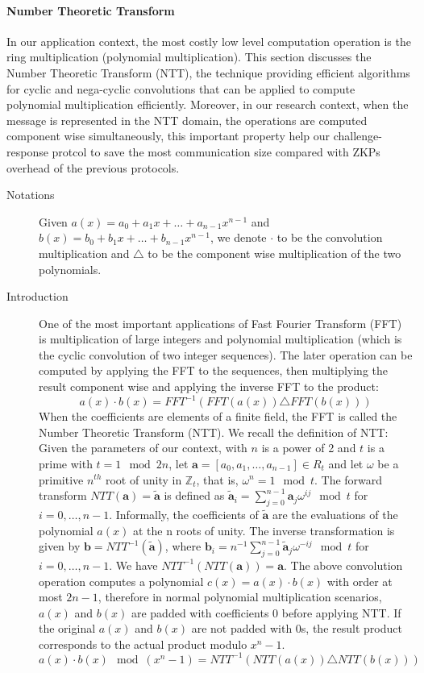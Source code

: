 \paragraph{Number Theoretic Transform}
In our application context, the most costly low level computation operation is
the ring multiplication (polynomial multiplication). This section discusses the
Number Theoretic Transform (NTT), the technique providing efficient algorithms
for cyclic and nega-cyclic convolutions that can be applied to compute
polynomial multiplication efficiently. Moreover, in our research context, when
the message is represented in the NTT domain, the operations are computed
component wise simultaneously, this important property help our
challenge-response protcol to save the most communication size compared with
ZKPs overhead of the previous protocols.
\begin{description}
\item[Notations] Given \(a(x) = a_{0} + a_{1}x + \dots + a_{n-1}x^{n-1}\) and
  \(b(x) = b_{0} + b_{1}x + \dots + b_{n-1}x^{n-1}\), we denote \(\cdot\) to be
  the convolution multiplication and \(\triangle\) to be the component wise
  multiplication of the two polynomials.
\item[Introduction] One of the most important applications of Fast Fourier
  Transform (FFT) is multiplication of large integers and polynomial
  multiplication (which is the cyclic convolution of two integer sequences). The
  later operation can be computed by applying the FFT to the sequences, then
  multiplying the result component wise and applying the inverse FFT to the
  product:
  \[
    a(x)\cdot b(x) = FFT^{-1}(FFT(a(x)) \triangle FFT(b(x)))
  \]
  When the coefficients are elements of a finite field, the FFT is called the
  Number Theoretic Transform (NTT). We recall the definition of NTT: Given the
  parameters of our context, with \(n\) is a power of 2 and \(t\) is a prime
  with \(t = 1 \mod 2n\), let
  \(\mathbf{a} = [a_{0}, a_{1}, \dots, a_{n-1}] \in R_{t}\) and let \(\omega\)
  be a primitive \(n^{th}\) root of unity in \(\mathbb{Z}_{t}\), that is,
  \(\omega^{n} = 1 \mod t\). The forward transform
  \(NTT(\mathbf{a}) = \tilde{\mathbf{a}}\) is defined as
  \(\tilde{\mathbf{a}}_{i} = \sum_{j=0}^{n-1}{\mathbf{a}_{j}}\omega^{ij} \mod
  t\) for \(i = 0, \dots, n -1\). Informally, the coefficients of
  \(\tilde{\mathbf{a}}\) are the evaluations of the polynomial \(a(x)\) at the n
  roots of unity. The inverse transformation is given by
  \(\mathbf{b} = NTT^{-1}(\tilde{\mathbf{a}})\), where
  \(\mathbf{b}_{i} = n^{-1}\sum_{j=0}^{n-1}\tilde{\mathbf{a}}_{j}\omega^{-ij}
  \mod t \) for \(i = 0, \dots, n - 1\). We have
  \(NTT^{-1}(NTT(\mathbf{a})) = \mathbf{a}\).  The above convolution operation
  computes a polynomial \(c(x) = a(x)\cdot b(x)\) with order at most \(2n - 1\),
  therefore in normal polynomial multiplication scenarios, \(a(x)\) and \(b(x)\)
  are padded with coefficients 0 before applying NTT. If the original \(a(x)\)
  and \(b(x)\) are not padded with 0s, the result product corresponds to the
  actual product modulo \(x^{n} - 1\).
  \[
a(x) \cdot b(x) \mod (x^{n} - 1) = NTT^{-1}(NTT(a(x)) \triangle NTT(b(x)))
  \]


\end{description}
